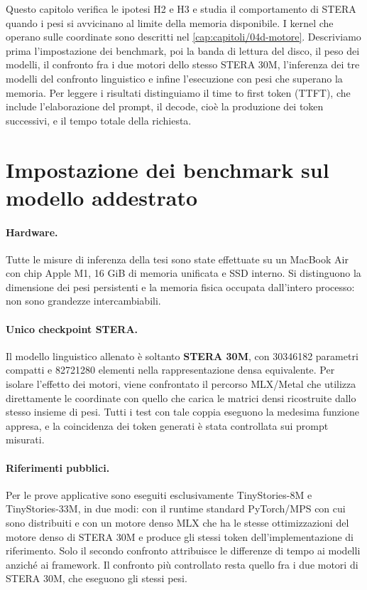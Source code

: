 Questo capitolo verifica le ipotesi H2 e H3 e studia il comportamento di STERA quando i pesi si avvicinano al limite della memoria disponibile. I kernel che operano sulle coordinate sono descritti nel \autoref{cap:capitoli/04d-motore}. Descriviamo prima l'impostazione dei benchmark, poi la banda di lettura del disco, il peso dei modelli, il confronto fra i due motori dello stesso STERA 30M, l'inferenza dei tre modelli del confronto linguistico e infine l'esecuzione con pesi che superano la memoria. Per leggere i risultati distinguiamo il time to first token (TTFT), che include l'elaborazione del prompt, il decode, cioè la produzione dei token successivi, e il tempo totale della richiesta.

\section{Impostazione dei benchmark sul modello addestrato}
\label{sec:sistemi-impostazione}

\paragraph{Hardware.} Tutte le misure di inferenza della tesi sono state effettuate su un MacBook Air con chip Apple M1, 16 GiB di memoria unificata e SSD interno. Si distinguono la dimensione dei pesi persistenti e la memoria fisica occupata dall'intero processo: non sono grandezze intercambiabili.

\paragraph{Unico checkpoint STERA.} Il modello linguistico allenato è soltanto \textbf{STERA 30M}, con \num{30346182} parametri compatti e \num{82721280} elementi nella rappresentazione densa equivalente. Per isolare l'effetto dei motori, viene confrontato il percorso MLX/Metal che utilizza direttamente le coordinate con quello che carica le matrici densi ricostruite dallo stesso insieme di pesi. Tutti i test con tale coppia eseguono la medesima funzione appresa, e la coincidenza dei token generati è stata controllata sui prompt misurati.

\paragraph{Riferimenti pubblici.} Per le prove applicative sono eseguiti esclusivamente TinyStories-8M e TinyStories-33M, in due modi: con il runtime standard PyTorch/MPS con cui sono distribuiti e con un motore denso MLX che ha le stesse ottimizzazioni del motore denso di STERA 30M e produce gli stessi token dell'implementazione di riferimento. Solo il secondo confronto attribuisce le differenze di tempo ai modelli anziché ai framework. Il confronto più controllato resta quello fra i due motori di STERA 30M, che eseguono gli stessi pesi.

